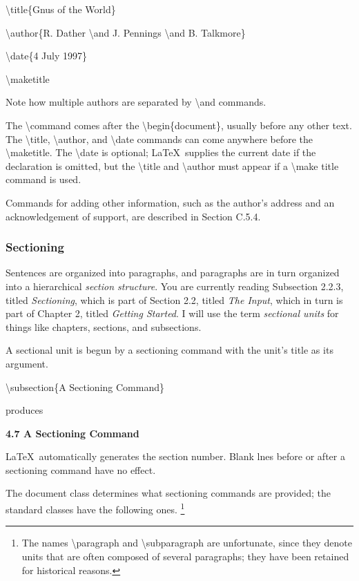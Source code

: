 \documentclass[twocolumn]{article}        %
\begin{document}
\textbackslash title\{Gnus of the World\}

\textbackslash author\{R. Dather \textbackslash and J. Pennings \textbackslash and B. Talkmore\}

\textbackslash date\{4 July 1997\}

\textbackslash maketitle

Note how multiple authors are separated by \textbackslash and commands.

The \textbackslash command comes after the \textbackslash begin\{document\}, usually before any other text. 
The \textbackslash title, \textbackslash author, and \textbackslash date commands can come anywhere before
the \textbackslash maketitle. The \textbackslash date is optional; \LaTeX\ supplies the current date if 
the declaration is omitted, but the \textbackslash title and \textbackslash author must appear if a 
\textbackslash make title command is used. 

Commands for adding other information, such as the author's address and an acknowledgement of support, are
described in Section C.5.4.

\subsubsection{Sectioning}

Sentences are organized into paragraphs, and paragraphs are in turn organized into a hierarchical 
\emph{section structure}. You are currently reading Subsection 2.2.3, titled \emph{Sectioning},
which is part of Section 2.2, titled \emph{The Input}, which in turn is part of Chapter 2, titled 
\emph{Getting Started}. I will use the term \emph{sectional units} for things like chapters, sections,
and subsections.

A sectional unit is begun by a sectioning command with the unit's title as its argument.

\hfill \break
\textbackslash subsection\{A Sectioning Command\}

produces

\textbf{4.7 A Sectioning Command}

\LaTeX\ automatically generates the section number. Blank lnes before or after a sectioning command have no effect.

The document class determines what sectioning commands are provided; the standard classes have the following ones.
\footnote{The names \textbackslash paragraph and \textbackslash subparagraph are unfortunate, since they denote units
that are often composed of several paragraphs; they have been retained for historical reasons.}
\end{document}
